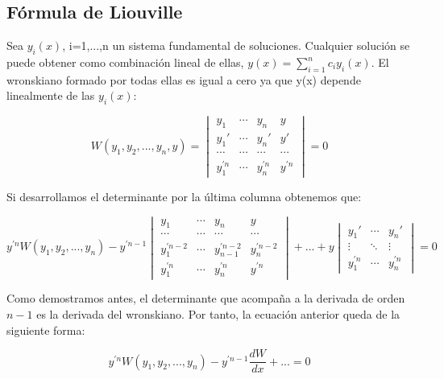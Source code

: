 \documentclass[a4paper,12pt,titlepage]{article}
\begin{document}
\subsection{Fórmula de Liouville}

Sea {$y_i(x)$, i=1,...,n} un sistema fundamental de soluciones. Cualquier solución se puede obtener como combinación lineal de ellas, $y(x) = \sum_{i=1}^{n} c_i y_i(x)$. El wronskiano formado por todas ellas es igual a cero ya que y(x) depende linealmente de las $y_i(x)$:


\begin{equation}
    W(y_1,y_2,...,y_n,y) = \begin{vmatrix}
        y_1 & \cdots & y_n & y \\
        y_1' & \cdots & y_n' & y' \\
        \cdots & \cdots & \cdots & \cdots \\
        y_1^{'n} & \cdots & y_n^{'n} & y^{'n}
    \end{vmatrix} = 0
\end{equation}

Si desarrollamos el determinante por la última columna obtenemos que:

\begin{equation}
    y^{'n} W(y_1,y_2,...,y_n) - y^{'n-1} 
    \begin{vmatrix}
        y_1 & \cdots & y_n & y \\
        \cdots & \cdots & \cdots & \cdots \\
        y_1^{'n-2} & \cdots & y_{n-1}^{'n-2} & y_n^{'n-2} \\
        y_1^{'n} & \cdots & y_n^{'n} & y^{'n}
    \end{vmatrix} + ... + y \begin{vmatrix}
        y_1' & \cdots & y_n' \\
        \vdots & \ddots & \vdots \\
        y_1^{'n} & \cdots & y_n^{'n}
    \end{vmatrix} = 0
\end{equation}

Como demostramos antes, el determinante que acompaña a la derivada de orden $n-1$ es la derivada del wronskiano. Por tanto, la ecuación anterior queda de la siguiente forma:

\begin{equation}
    y^{'n} W(y_1,y_2,...,y_n) - y^{'n-1} \frac{dW}{dx} + ... = 0
\end{equation}
\end{document}
